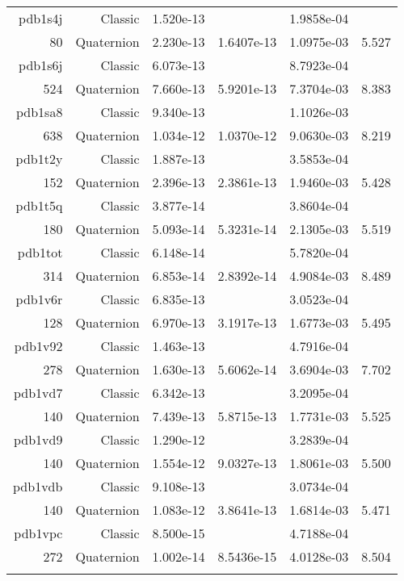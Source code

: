 \begin{xltabular}{\textwidth}{r|rS[table-format=1.3e+2]S[table-format=1.4e+2]S[table-format=1.4e+2]S[table-format=-1.3]}
pdb1s4j & Classic & 1.520e-13 &  & 1.9858e-04 & \\
80 & Quaternion & 2.230e-13 & 1.6407e-13 & 1.0975e-03 & 5.527\\  \addlinespace
pdb1s6j & Classic & 6.073e-13 &  & 8.7923e-04 & \\
524 & Quaternion & 7.660e-13 & 5.9201e-13 & 7.3704e-03 & 8.383\\  \addlinespace
pdb1sa8 & Classic & 9.340e-13 &  & 1.1026e-03 & \\
638 & Quaternion & 1.034e-12 & 1.0370e-12 & 9.0630e-03 & 8.219\\  \addlinespace
pdb1t2y & Classic & 1.887e-13 &  & 3.5853e-04 & \\
152 & Quaternion & 2.396e-13 & 2.3861e-13 & 1.9460e-03 & 5.428\\  \addlinespace
pdb1t5q & Classic & 3.877e-14 &  & 3.8604e-04 & \\
180 & Quaternion & 5.093e-14 & 5.3231e-14 & 2.1305e-03 & 5.519\\  \addlinespace
pdb1tot & Classic & 6.148e-14 &  & 5.7820e-04 & \\
314 & Quaternion & 6.853e-14 & 2.8392e-14 & 4.9084e-03 & 8.489\\  \addlinespace
pdb1v6r & Classic & 6.835e-13 &  & 3.0523e-04 & \\
128 & Quaternion & 6.970e-13 & 3.1917e-13 & 1.6773e-03 & 5.495\\  \addlinespace
pdb1v92 & Classic & 1.463e-13 &  & 4.7916e-04 & \\
278 & Quaternion & 1.630e-13 & 5.6062e-14 & 3.6904e-03 & 7.702\\  \addlinespace
pdb1vd7 & Classic & 6.342e-13 &  & 3.2095e-04 & \\
140 & Quaternion & 7.439e-13 & 5.8715e-13 & 1.7731e-03 & 5.525\\  \addlinespace
pdb1vd9 & Classic & 1.290e-12 &  & 3.2839e-04 & \\
140 & Quaternion & 1.554e-12 & 9.0327e-13 & 1.8061e-03 & 5.500\\  \addlinespace
pdb1vdb & Classic & 9.108e-13 &  & 3.0734e-04 & \\
140 & Quaternion & 1.083e-12 & 3.8641e-13 & 1.6814e-03 & 5.471\\  \addlinespace
pdb1vpc & Classic & 8.500e-15 &  & 4.7188e-04 & \\
272 & Quaternion & 1.002e-14 & 8.5436e-15 & 4.0128e-03 & 8.504\\  \addlinespace

\end{xltabular}
